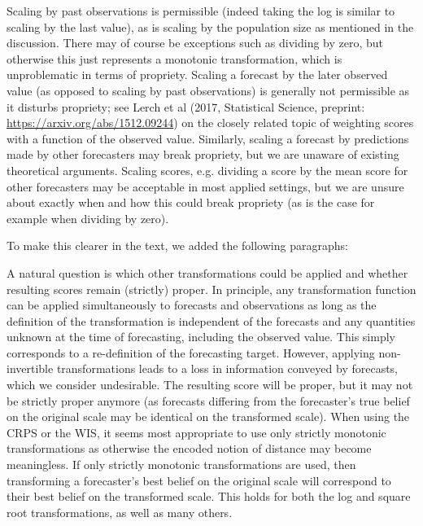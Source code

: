 \documentclass{article}
\newcommand{\indented}{\setlength{\leftskip}{1cm}}
\begin{document}
Scaling by past observations is permissible (indeed taking the log is similar to scaling by the last value), as is scaling by the population size as mentioned in the discussion. There may of course be exceptions such as dividing by zero, but otherwise this just represents a monotonic transformation, which is unproblematic in terms of propriety. Scaling a forecast by the later observed value (as opposed to scaling by past observations) is generally not permissible as it disturbs propriety; see Lerch et al (2017, Statistical Science, preprint: \url{https://arxiv.org/abs/1512.09244}) on the closely related topic of weighting scores with a function of the observed value. Similarly, scaling a forecast by predictions made by other forecasters may break propriety, but we are unaware of existing theoretical arguments. Scaling scores, e.g. dividing a score by the mean score for other forecasters may be acceptable in most applied settings, but we are unsure about exactly when and how this could break propriety (as is the case for example when dividing by zero). 

To make this clearer in the text, we added the following paragraphs: 

\indented
A natural question is which other transformations could be applied and whether resulting scores remain (strictly) proper. In principle, any transformation function can be applied simultaneously to forecasts and observations as long as the definition of the transformation is independent of the forecasts and any quantities unknown at the time of forecasting, including the observed value. This simply corresponds to a re-definition of the forecasting target. However, applying non-invertible transformations leads to a loss in information conveyed by forecasts, which we consider undesirable. The resulting score will be proper, but it may not be strictly proper anymore (as forecasts differing from the forecaster's true belief on the original scale may be identical on the transformed scale). When using the CRPS or the WIS, it seems most appropriate to use only strictly monotonic transformations as otherwise the encoded notion of distance may become meaningless. If only strictly monotonic transformations are used, then transforming a forecaster's best belief on the original scale will correspond to their best belief on the transformed scale. This holds for both the log and square root transformations, as well as many others. 
\end{document}
